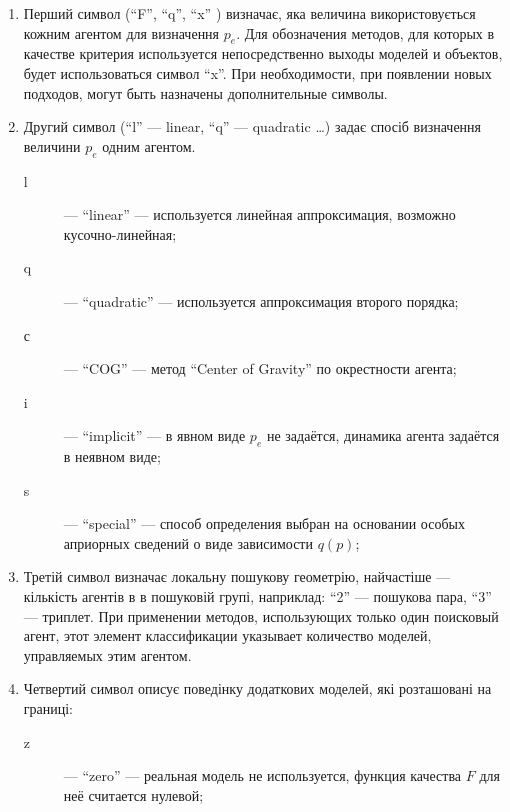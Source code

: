 \begin{enumerate}

  \item
  Перший символ (``F'', ``q'', ``x'' ) визначає,
  яка величина використовується кожним агентом для визначення $p_e$.
   Для обозначения методов, для которых в качестве критерия используется
   непосредственно выходы моделей и объектов, будет использоваться символ ``x''.
   При необходимости, при появлении новых подходов,
   могут быть назначены дополнительные символы.

  \item
    Другий символ (``l'' --- linear, ``q'' --- quadratic \ldots ) 
    задає спосіб визначення величини $p_e$ одним агентом.

    \begin{description}

      \item[l]  --- ``linear'' ---
        используется линейная аппроксимация, возможно кусочно-линейная;

      \item[q]  --- ``quadratic'' ---
        используется аппроксимация второго порядка;

      \item[с] --- ``COG'' ---
        метод ``Center of Gravity'' по окрестности агента;

      \item[i] --- ``implicit'' ---
        в явном виде $p_e$ не задаётся, динамика агента задаётся в неявном виде;

      \item[s] --- ``special'' ---
        способ определения выбран на основании особых априорных сведений о виде зависимости $q(p)$;

    \end{description}

  \item
    Третій символ визначає локальну пошукову геометрію, найчастіше --- кількість
    агентів в в пошуковій групі, наприклад: ``2'' --- пошукова пара, ``3'' --- триплет.
    При применении методов, использующих только один поисковый агент,
    этот элемент классификации указывает количество моделей, управляемых этим агентом.

  \item
    Четвертий символ
    описує поведінку додаткових моделей, які розташовані на границі:
    \begin{description}

      \item[z]  --- ``zero'' ---
        реальная модель не используется, функция качества $F$ для неё считается нулевой;


\end{description}
\end{enumerate}
